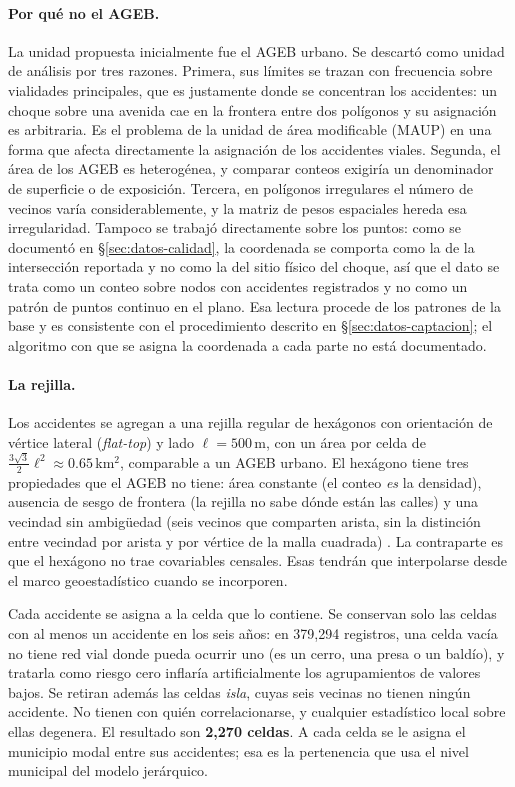 \paragraph{Por qué no el AGEB.} La unidad propuesta inicialmente fue el AGEB
urbano. Se descartó como unidad de análisis por tres razones. Primera, sus
límites se trazan con frecuencia sobre vialidades principales, que es
justamente donde se concentran los accidentes: un choque sobre una avenida
cae en la frontera entre dos polígonos y su asignación es arbitraria. Es el
problema de la unidad de área modificable (MAUP)
\parencite{openshaw1984maup} en una forma que afecta directamente la asignación de los accidentes viales.
Segunda, el área de los AGEB es heterogénea, y comparar conteos exigiría un
denominador de superficie o de exposición. Tercera, en polígonos irregulares
el número de vecinos varía considerablemente, y la matriz de pesos espaciales hereda esa
irregularidad. Tampoco se trabajó directamente sobre los puntos: como se
documentó en §\ref{sec:datos-calidad}, la coordenada se comporta como la de la
intersección reportada y no como la del sitio físico del choque, así que el
dato se trata como un conteo sobre nodos con accidentes registrados y no como un patrón de
puntos continuo en el plano. Esa lectura procede de los patrones de la base y es consistente con el
procedimiento descrito en §\ref{sec:datos-captacion}; el algoritmo con que se
asigna la coordenada a cada parte no está documentado.

\paragraph{La rejilla.} Los accidentes se agregan a una rejilla regular de
hexágonos con orientación de vértice lateral (\emph{flat-top}) y lado
$\ell = 500$\,m, con un área por celda de
$\tfrac{3\sqrt{3}}{2}\ell^2 \approx 0.65$\,km$^2$, comparable a un AGEB
urbano. El hexágono tiene tres propiedades que el AGEB no tiene: área
constante (el conteo \emph{es} la densidad), ausencia de sesgo de frontera
(la rejilla no sabe dónde están las calles) y una vecindad sin ambigüedad
(seis vecinos que comparten arista, sin la distinción entre vecindad por
arista y por vértice de la malla cuadrada) \parencite{birch2007grids}. La
contraparte es que el hexágono no trae covariables censales. Esas tendrán
que interpolarse desde el marco geoestadístico cuando se incorporen.

Cada accidente se asigna a la celda que lo contiene. Se conservan solo las
celdas con al menos un accidente en los seis años: en 379,294 registros, una celda vacía no tiene red vial donde pueda ocurrir uno (es un cerro, una presa o un baldío), y tratarla como riesgo cero inflaría artificialmente los
agrupamientos de valores bajos. Se retiran además las celdas \emph{isla},
cuyas seis vecinas no tienen ningún accidente. No tienen con quién
correlacionarse, y cualquier estadístico local sobre ellas degenera. El
resultado son \textbf{2,270 celdas}. A cada celda se le asigna el municipio
modal entre sus accidentes; esa es la pertenencia que usa el nivel municipal
del modelo jerárquico.

